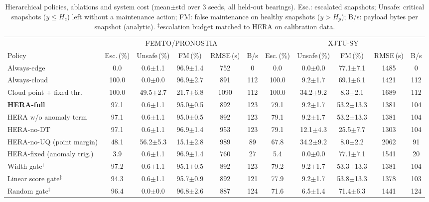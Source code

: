 \begin{table}[t]
\centering
\caption{Hierarchical policies, ablations and system cost (mean$\pm$std over 3 seeds, all held-out bearings). Esc.: escalated snapshots; Unsafe: critical snapshots ($y{\le}H_c$) left without a maintenance action; FM: false maintenance on healthy snapshots ($y{>}H_p$); B/s: payload bytes per snapshot (analytic). $^\ddagger$escalation budget matched to HERA on calibration data.}
\label{tab:policies}
\setlength{\tabcolsep}{3.4pt}\footnotesize
\begin{tabular}{l|ccccc|ccccc}
\toprule
 & \multicolumn{5}{c|}{FEMTO/PRONOSTIA} & \multicolumn{5}{c}{XJTU-SY} \\
Policy & Esc.\,(\%) & Unsafe\,(\%) & FM\,(\%) & RMSE\,(s) & B/s & Esc.\,(\%) & Unsafe\,(\%) & FM\,(\%) & RMSE\,(s) & B/s \\
\midrule
Always-edge & 0.0 & 0.6$\pm$1.1 & 96.9$\pm$1.4 & 752 & 0 & 0.0 & 0.0$\pm$0.0 & 77.1$\pm$7.1 & 1485 & 0 \\
Always-cloud & 100.0 & 0.0$\pm$0.0 & 96.9$\pm$2.7 & 891 & 112 & 100.0 & 9.2$\pm$1.7 & 69.1$\pm$6.1 & 1421 & 112 \\
Cloud point + fixed thr. & 100.0 & 49.5$\pm$2.7 & 21.7$\pm$6.8 & 1090 & 112 & 100.0 & 34.2$\pm$9.2 & 8.3$\pm$2.1 & 1689 & 112 \\
\midrule
\textbf{HERA-full} & 97.1 & 0.6$\pm$1.1 & 95.0$\pm$0.5 & 892 & 123 & 79.1 & 9.2$\pm$1.7 & 53.2$\pm$13.3 & 1381 & 104 \\
HERA w/o anomaly term & 97.1 & 0.6$\pm$1.1 & 95.0$\pm$0.5 & 892 & 123 & 79.1 & 9.2$\pm$1.7 & 53.2$\pm$13.3 & 1381 & 104 \\
HERA-no-DT & 97.1 & 0.6$\pm$1.1 & 96.9$\pm$1.4 & 953 & 123 & 79.1 & 12.1$\pm$4.3 & 25.5$\pm$7.7 & 1303 & 104 \\
\midrule
HERA-no-UQ (point margin) & 48.1 & 56.2$\pm$5.3 & 15.1$\pm$2.8 & 989 & 89 & 67.8 & 34.2$\pm$9.2 & 8.0$\pm$2.2 & 2062 & 91 \\
HERA-fixed (anomaly trig.) & 3.9 & 0.6$\pm$1.1 & 96.9$\pm$1.4 & 760 & 27 & 5.4 & 0.0$\pm$0.0 & 77.1$\pm$7.1 & 1541 & 20 \\
\midrule
Width gate$^\ddagger$ & 97.2 & 0.6$\pm$1.1 & 95.1$\pm$0.5 & 892 & 123 & 79.2 & 9.2$\pm$1.7 & 53.3$\pm$13.3 & 1381 & 104 \\
Linear score gate$^\ddagger$ & 94.3 & 0.6$\pm$1.1 & 95.7$\pm$0.9 & 892 & 121 & 77.9 & 9.2$\pm$1.7 & 53.8$\pm$13.3 & 1378 & 103 \\
Random gate$^\ddagger$ & 96.4 & 0.0$\pm$0.0 & 96.8$\pm$2.6 & 887 & 124 & 71.6 & 6.5$\pm$1.4 & 71.4$\pm$6.3 & 1441 & 124 \\
\bottomrule
\end{tabular}
\end{table}
